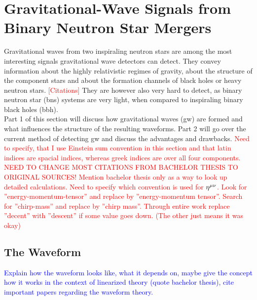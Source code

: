 \section{Gravitational-Wave Signals from Binary Neutron Star Mergers}\label{sec:gravitational_waves}
Gravitational waves from two inspiraling neutron stars are among the most interesting signals gravitational wave detectors can detect. They convey information about the highly relativistic regimes of gravity, about the structure of the component stars and about the formation channels of black holes or heavy neutron stars. \textcolor{red}{[Citations]} They are however also very hard to detect, as binary neutron star (\gls{bns}) systems are very light, when compared to inspiraling binary black holes (\gls{bbh}).\\
Part 1 of this section will discuss how gravitational waves (\gls{gw}) are formed and what influences the structure of the resulting waveforms. Part 2 will go over the current method of detecting \gls{gw} and discuss the advantages and drawbacks. \textcolor{red}{Need to specify, that I use Einstein sum convention in this section and that latin indices are spacial indices, whereas greek indices are over all four components. NEED TO CHANGE MOST CITATIONS FROM BACHELOR THESIS TO ORIGINAL SOURCES! Mention bachelor thesis only as a way to look up detailed calculations. Need to specify which convention is used for $\eta^{\mu\nu}$. Look for ''energy-momentum-tensor'' and replace by ''energy-momentum tensor''. Search for ''chirp-mass'' and replace by ''chirp mass''. Through entire work replace ''decent'' with ''descent'' if some value goes down. (The other just means it was okay)}
\subsection{The Waveform}
\textcolor{blue}{Explain how the waveform looks like, what it depends on, maybe give the concept how it works in the context of linearized theory (quote bachelor thesis), cite important papers regarding the waveform theory.}\\
